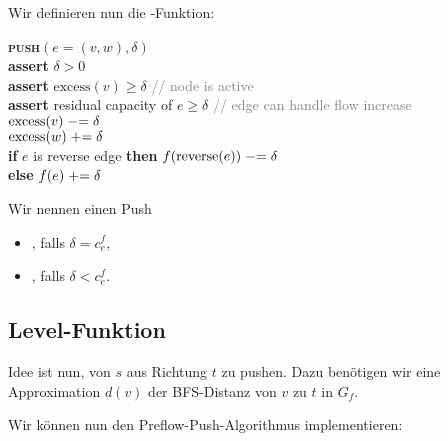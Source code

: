 Wir definieren nun die -Funktion:

\begin{pseudocode}
  \textbf{\textsc{push}}\( (e = (v,w), \delta) \) \\
  \phantom{\enskip} \textbf{assert} \( \delta > 0 \) \\
  \phantom{\enskip} \textbf{assert} \(  \text{excess}(v) \geq \delta \) \enskip{} \textcolor{gray}{// node is active}\\
  \phantom{\enskip} \textbf{assert} residual capacity of \( e \geq \delta \) \enskip{} \textcolor{gray}{// edge can handle flow increase}\\
  \phantom{\enskip} \( \text{excess}(v) \mathrel{-}= \delta \) \\
  \phantom{\enskip} \( \text{excess}(w) \mathrel{+}= \delta \) \\
  \phantom{\enskip} \textbf{if} \( e \) is reverse edge \textbf{then} \( f(\text{reverse}(e)) \mathrel{-}= \delta \) \\
  \phantom{\enskip} \textbf{else} \( f(e) \mathrel{+}= \delta \)
\end{pseudocode}

Wir nennen einen Push
\begin{itemize}
  \item {}, falls \( \delta = c_e^f \),
  \item {}, falls \( \delta < c_e^f \).
\end{itemize}

\subsection{Level-Funktion}

Idee ist nun, von \( s \) aus Richtung \( t \) zu pushen. Dazu benötigen wir eine Approximation \( d(v) \) der BFS-Distanz von \( v \) zu \( t \) in \( G_f \).

Wir können nun den Preflow-Push-Algorithmus implementieren:

